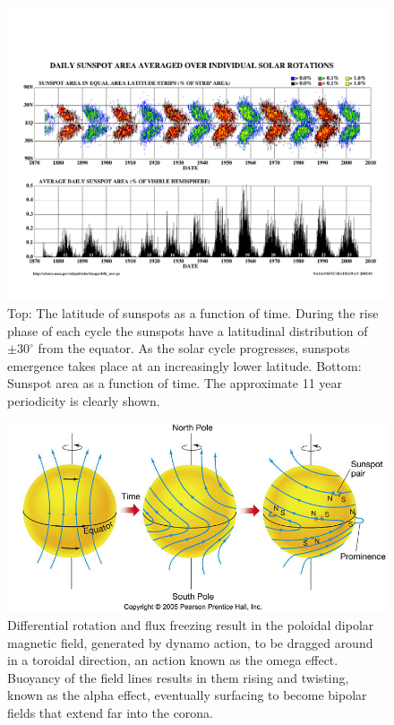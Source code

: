 \begin{figure}[!t]
\begin{center}
\includegraphics[scale=0.55, trim =1cm 2cm 0cm 3cm]{images/bfly_new.pdf}
\caption[The solar butterfly diagram]{Top: The latitude of sunspots as a function of time. During the rise phase of each cycle the sunspots have a latitudinal distribution of $\pm30^{\circ}$ from the equator.  As the solar cycle progresses, sunspots emergence takes place at an increasingly lower latitude. Bottom: Sunspot area as a function of time. The approximate 11 year periodicity is clearly shown.}
\label{fig:butterfly} 
\end{center}
\end{figure}
\begin{figure}[!h]
\begin{center}
\includegraphics[]{images/Babcock}
\caption[The Babcock model of magnetic field evolution in the Sun]{Differential rotation and flux freezing result in the poloidal dipolar magnetic field, generated by dynamo action, to be dragged around in a toroidal direction, an action known as the omega effect. Buoyancy of the field lines results in them rising and twisting, known as the alpha effect, eventually surfacing to become bipolar fields that extend far into the corona.}
\label{fig:Babcock} 
\end{center}
\end{figure}

